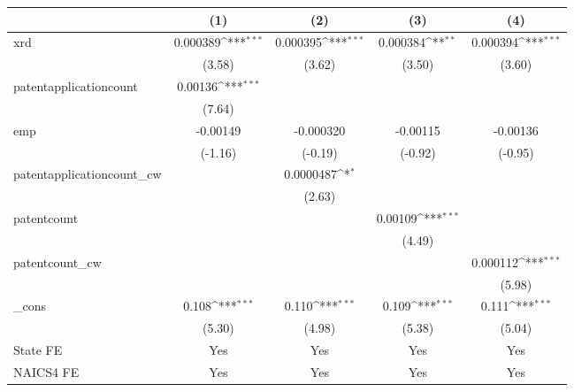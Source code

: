 {
\def\sym#1{\ifmmode^{#1}\else\(^{#1}\)\fi}
\begin{tabular}{l*{4}{c}}
\hline\hline
            &\multicolumn{1}{c}{(1)}         &\multicolumn{1}{c}{(2)}         &\multicolumn{1}{c}{(3)}         &\multicolumn{1}{c}{(4)}         \\
\hline
xrd         &    0.000389\sym{***}&    0.000395\sym{***}&    0.000384\sym{**} &    0.000394\sym{***}\\
            &      (3.58)         &      (3.62)         &      (3.50)         &      (3.60)         \\
[1em]
patentapplicationcount&     0.00136\sym{***}&                     &                     &                     \\
            &      (7.64)         &                     &                     &                     \\
[1em]
emp         &    -0.00149         &   -0.000320         &    -0.00115         &    -0.00136         \\
            &     (-1.16)         &     (-0.19)         &     (-0.92)         &     (-0.95)         \\
[1em]
patentapplicationcount\_cw&                     &   0.0000487\sym{*}  &                     &                     \\
            &                     &      (2.63)         &                     &                     \\
[1em]
patentcount &                     &                     &     0.00109\sym{***}&                     \\
            &                     &                     &      (4.49)         &                     \\
[1em]
patentcount\_cw&                     &                     &                     &    0.000112\sym{***}\\
            &                     &                     &                     &      (5.98)         \\
[1em]
\_cons      &       0.108\sym{***}&       0.110\sym{***}&       0.109\sym{***}&       0.111\sym{***}\\
            &      (5.30)         &      (4.98)         &      (5.38)         &      (5.04)         \\
[1em]
State FE    &         Yes         &         Yes         &         Yes         &         Yes         \\
[1em]
NAICS4 FE   &         Yes         &         Yes         &         Yes         &         Yes         \\

\end{tabular}}
